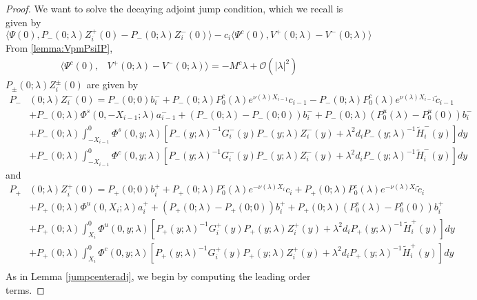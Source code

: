 \documentclass[thesis.tex]{subfiles}
\begin{document}
\begin{lemma}
\begin{proof}
We want to solve the decaying adjoint jump condition, which we recall is given by
\[
\langle \Psi(0), P_-(0; \lambda) Z_i^+(0) - P_-(0; \lambda) Z_i^-(0) \rangle - c_i \langle \Psi^c(0), V^+(0; \lambda) - V^-(0; \lambda) \rangle 
\]
From \cref{lemma:VpmPsiIP},
\begin{align*}
\langle \Psi^c(0), &V^+(0; \lambda) - V^-(0; \lambda) \rangle = -M^c \lambda + \mathcal{O}(|\lambda|^2)
\end{align*}
$P_\pm(0; \lambda) Z_i^\pm(0)$ are given by
\begin{align*}
P_-&(0; \lambda) Z_i^-(0) = P_-(0; 0) b_i^- + P_-(0; \lambda)P_0^c(\lambda) e^{\nu(\lambda) X_{i-1}} c_{i-1} - P_-(0; \lambda)P_0^c(\lambda) e^{\nu(\lambda) X_{i-1}} \tilde{c}_{i-1} \\
&+ P_-(0; \lambda) \Phi^s(0, -X_{i-1}; \lambda) a_{i-1}^- + (P_-(0; \lambda) - P_-(0; 0))b_i^- + P_-(0; \lambda)(P_0^u(\lambda) - P_0^u(0))b_i^- \\
&+ P_-(0; \lambda) \int_{-X_{i-1}}^0 \Phi^s(0, y; \lambda) [P_-(y; \lambda)^{-1} G_i^-(y) P_-(y; \lambda)Z_i^-(y) + \lambda^2 d_i P_-(y; \lambda)^{-1} \tilde{H}_i^-(y)] dy \\
&+ P_-(0; \lambda) \int_{-X_{i-1}}^0 \Phi^c(0, y; \lambda) [P_-(y; \lambda)^{-1} G_i^-(y) P_-(y; \lambda)Z_i^-(y) + \lambda^2 d_i P_-(y; \lambda)^{-1} \tilde{H}_i^-(y)] dy
\end{align*}
and
\begin{align*}
P_+&(0; \lambda) Z_i^+(0) = P_+(0; 0) b_i^+ + P_+(0; \lambda) P_0^c(\lambda) e^{-\nu(\lambda)X_i} c_i + P_+(0; \lambda) P_0^c(\lambda) e^{-\nu(\lambda)X_i} \tilde{c}_i \\
&+ P_+(0; \lambda) \Phi^u(0, X_i; \lambda) a_i^+ + (P_+(0; \lambda) - P_+(0; 0)) b_i^+ + P_+(0; \lambda) (P_0^s(\lambda) - P_0^s(0)) b_i^+ \\
&+ P_+(0; \lambda) \int_{X_i}^0 \Phi^u(0, y; \lambda) [P_+(y; \lambda)^{-1} G_i^+(y) P_+(y; \lambda) Z_i^+(y) + \lambda^2 d_i P_+(y; \lambda)^{-1} \tilde{H}_i^+(y)] dy \\
&+ P_+(0; \lambda) \int_{X_i}^0 \Phi^c(0, y; \lambda) [P_+(y; \lambda)^{-1} G_i^+(y) P_+(y; \lambda) Z_i^+(y) + \lambda^2 d_i P_+(y; \lambda)^{-1} \tilde{H}_i^+(y)] dy \\
\end{align*}
As in Lemma \ref{jumpcenteradj}, we begin by computing the leading order terms.


\end{proof}
\end{lemma}
\end{document}
